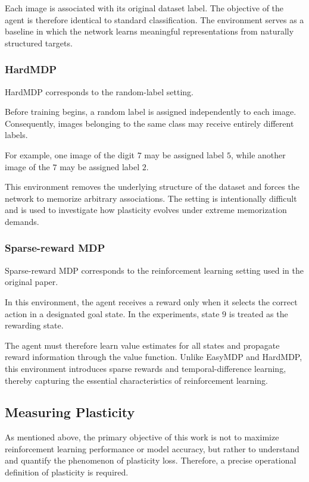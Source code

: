 Each image is associated with its original dataset label. The objective of the agent is therefore identical to standard classification. The environment serves as a baseline in which the network learns meaningful representations from naturally structured targets.

\subsubsection{HardMDP}

HardMDP corresponds to the random-label setting.

Before training begins, a random label is assigned independently to each image. Consequently, images belonging to the same class may receive entirely different labels.

For example, one image of the digit $7$ may be assigned label $5$, while another image of the $7$ may be assigned label $2$.

This environment removes the underlying structure of the dataset and forces the network to memorize arbitrary associations. The setting is intentionally difficult and is used to investigate how plasticity evolves under extreme memorization demands.

\subsubsection{Sparse-reward MDP}

Sparse-reward MDP corresponds to the reinforcement learning setting used in the original paper.

In this environment, the agent receives a reward only when it selects the correct action in a designated goal state. In the experiments, state $9$ is treated as the rewarding state.

The agent must therefore learn value estimates for all states and propagate reward information through the value function. Unlike EasyMDP and HardMDP, this environment introduces sparse rewards and temporal-difference learning, thereby capturing the essential characteristics of reinforcement learning.


\subsection{Measuring Plasticity}

As mentioned above, the primary objective of this work is not to maximize reinforcement learning performance or model accuracy, but rather to understand and quantify the phenomenon of plasticity loss. Therefore, a precise operational definition of plasticity is required.

